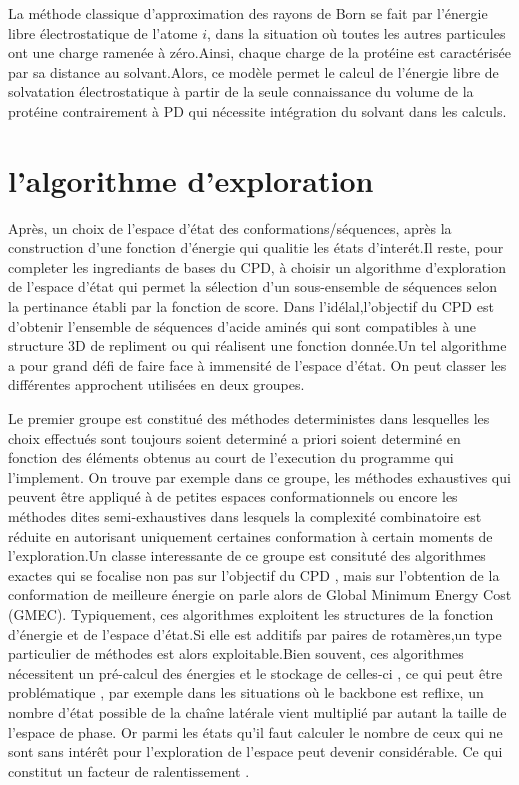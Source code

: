 La méthode classique d'approximation des rayons de Born se fait par l'énergie libre électrostatique de l'atome $i$, dans la situation où toutes les autres particules ont une charge ramenée à zéro.Ainsi, chaque charge  de la protéine est caractérisée par sa distance au solvant.Alors, ce modèle permet le calcul de l'énergie libre de solvatation électrostatique à partir de la seule connaissance du volume de la protéine contrairement à PD qui nécessite intégration du solvant dans les calculs.


\section{l'algorithme d'exploration}

Après, un choix de l'espace d'état des conformations/séquences, après la construction d'une fonction d'énergie qui qualitie les états d'interét.Il reste, pour completer les ingrediants de bases du CPD, à choisir un algorithme d'exploration de l'espace d'état qui permet la sélection d'un sous-ensemble de séquences selon la pertinance établi par la fonction de score. Dans l'idélal,l'objectif du CPD est d'obtenir l'ensemble de séquences d'acide aminés qui sont compatibles à une structure 3D de repliment ou qui réalisent une fonction donnée.Un tel algorithme a pour grand défi de faire face à immensité de l'espace d'état. On peut classer les différentes approchent utilisées en deux groupes.

  Le premier groupe est constitué des méthodes deterministes dans lesquelles les choix effectués sont toujours soient determiné  a priori soient determiné en fonction des éléments obtenus au court de l'execution du programme qui l'implement. On trouve par exemple dans ce groupe, les méthodes exhaustives qui peuvent être appliqué à de petites espaces conformationnels ou encore les méthodes dites semi-exhaustives dans lesquels la complexité combinatoire est réduite en autorisant uniquement  certaines conformation à certain moments de l'exploration.Un classe interessante de ce groupe est consituté des algorithmes exactes qui se focalise non pas sur l'objectif du  CPD , mais sur l'obtention  de la conformation  de meilleure  énergie on parle alors de \og Global Minimum Energy Cost \fg (GMEC).
Typiquement, ces algorithmes exploitent les structures de la fonction d'énergie et de l'espace d'état.Si elle est additifs par paires de rotamères,un type particulier de méthodes est alors exploitable.Bien souvent, ces algorithmes  nécessitent un pré-calcul des énergies et le stockage de celles-ci , ce qui peut être problématique , par exemple dans les situations où le backbone est reflixe, un nombre d'état possible de la chaîne latérale vient multiplié par autant la taille de l'espace de phase. Or parmi les états qu'il faut calculer le nombre de ceux qui ne sont sans intérêt pour l'exploration de l'espace peut devenir considérable. Ce qui constitut un facteur de ralentissement . 
  

